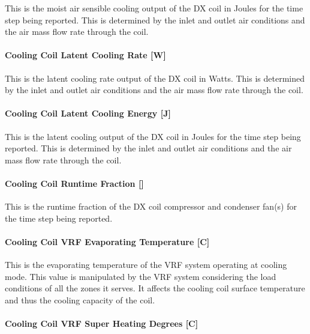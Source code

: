 This is the moist air sensible cooling output of the DX coil in Joules for the time step being reported. This is determined by the inlet and outlet air conditions and the air mass flow rate through the coil.

\paragraph{Cooling Coil Latent Cooling Rate {[}W{]}}\label{cooling-coil-latent-cooling-rate-w-1}

This is the latent cooling rate output of the DX coil in Watts. This is determined by the inlet and outlet air conditions and the air mass flow rate through the coil.

\paragraph{Cooling Coil Latent Cooling Energy {[}J{]}}\label{cooling-coil-latent-cooling-energy-j-1}

This is the latent cooling output of the DX coil in Joules for the time step being reported. This is determined by the inlet and outlet air conditions and the air mass flow rate through the coil.

\paragraph{\texorpdfstring{Cooling Coil Runtime Fraction {[]}}{Cooling Coil Runtime Fraction }}\label{cooling-coil-runtime-fraction-1}

This is the runtime fraction of the DX coil compressor and condenser fan(s) for the time step being reported.

\paragraph{Cooling Coil VRF Evaporating Temperature {[}C{]}}\label{cooling-coil-vrf-evaporating-temperature-c}

This is the evaporating temperature of the VRF system operating at cooling mode. This value is manipulated by the VRF system considering the load conditions of all the zones it serves. It affects the cooling coil surface temperature and thus the cooling capacity of the coil.

\paragraph{Cooling Coil VRF Super Heating Degrees {[}C{]}}\label{cooling-coil-vrf-super-heating-degrees-c}

